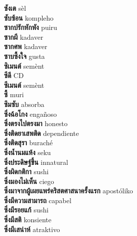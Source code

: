 \textbf{ ซังเต  } sèl \\
\textbf{ ซับซ้อน  } kompleho \\
\textbf{ ซากปรักหักพัง  } puiru \\
\textbf{ ซากผี  } kadaver \\
\textbf{ ซากศพ  } kadaver \\
\textbf{ ซาบซึ้งใจ  } gusta \\
\textbf{ ซิเมนต์  } semènt \\
\textbf{ ซีดี  } CD \\
\textbf{ ซีเมนต์  } semènt \\
\textbf{ ซี้  } muri \\
\textbf{ ซึมซับ  } absorba \\
\textbf{ ซึ่งฉ้อโกง  } engañoso \\
\textbf{ ซึ่งตรงไปตรงมา  } honesto \\
\textbf{ ซึ่งติดยาเสพติด  } dependiente \\
\textbf{ ซึ่งติดสุรา  } buraché \\
\textbf{ ซึ่งน้ำนมแห้ง  } seku \\
\textbf{ ซึ่งประดิษฐ์ขึ้น  } innatural \\
\textbf{ ซึ่งผิดกติกา  } sushi \\
\textbf{ ซึ่งมองไม่เห็น  } ciego \\
\textbf{ ซึ่งมาจากผู้เผยแพร่คริสตศาสนาครั้งแรก  } apostóliko \\
\textbf{ ซึ่งมีความสามารถ  } capabel \\
\textbf{ ซึ่งมีรอยแก้  } sushi \\
\textbf{ ซึ่งมีสติ  } konsiente \\
\textbf{ ซึ่งมีเสน่าห์  } atraktivo \\
